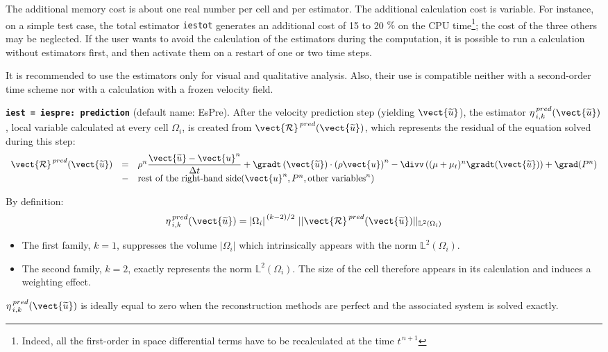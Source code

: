 The additional memory cost is about one real number per cell and per
estimator. The additional calculation cost is variable. For instance, on a
simple test case, the total estimator {\tt iestot} generates an additional cost
of 15 to 20 $\%$ on the CPU time\footnote{Indeed, all the first-order in
space differential terms have to be recalculated at the time $t^{\,n+1}$};
the cost of the three others may be neglected. If the user wants to
avoid the calculation of the estimators during the computation, it is
possible to run a calculation without estimators first, and then activate them on
a restart of one or two time steps.

It is recommended to use the estimators only for visual and qualitative
analysis. Also, their use is compatible neither with a second-order time scheme
nor with a calculation with a frozen velocity field.

{\tt \bf iest = iespre: prediction} (default name: EsPre).
After the velocity prediction step (yielding $\vect{\widetilde{u}}$), the
estimator $\eta^{\,pred}_{\,i,k}(\vect{\widetilde{u}})$, local variable calculated
at every cell $\Omega_i$, is created from $\vect{\mathcal
R}^{\,pred}(\vect{\widetilde{u}})$, which represents the residual of the equation
solved during this step:
\begin{equation*}
\begin{array}{r c l}
\vect{\mathcal{R}}^{\,pred}(\vect{\widetilde{u}})&= & \rho^n
    \dfrac{\vect{\widetilde{u}}-\vect{u}^n}{\Delta t}
  + \gradt \left(\vect{\widetilde{u}} \right) \cdot \left(\rho  \vect{u}\right)^n
              - \divv \left((\mu+\mu_t)^n \gradt(\vect{\widetilde{u}}) \right)
              + \grad(P^n)     \\
              &- &\text{rest of the right-hand side}
                        (\vect{u}^n, P^n, \text{other variables}^n)
\end{array}
\end{equation*}

By definition:
$$ \eta^{\,pred}_{\,i,k}(\vect{\widetilde{u}})= {|\Omega_i|}^{\,(k-2)/2}\ ||\vect{\mathcal R}^{\,pred}(\vect{\widetilde{u}})||
_{{\mathbb{L}}^{2}(\Omega_i)}$$
%
\begin{itemize}
\item The first family, $k=1$, suppresses the
volume $|\Omega_i|$ which intrinsically appears with the norm
${{\mathbb{L}}^{2}(\Omega_i)}$.
\item The second family, $k=2$, exactly represents the norm
${{\mathbb{L}}^{2}(\Omega_i)}$. The size of the cell therefore
appears in its calculation and induces a weighting effect.
\end{itemize}
$ \eta^{\,pred}_{\,i,k}(\vect{\widetilde{u}})$  is ideally equal to zero when the
reconstruction methods are perfect and the associated system is
solved exactly.


